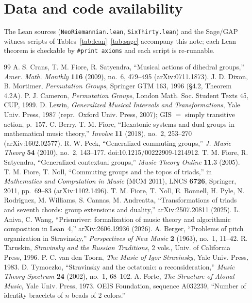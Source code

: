 \documentclass[11pt]{article}
\newcommand{\lean}[1]{\texttt{#1}}
\begin{document}
\section*{Data and code availability}
The Lean sources (\lean{NeoRiemannian.lean}, \lean{SixThirty.lean}) and the Sage/GAP witness scripts of
Tables~\ref{tab:lean}--\ref{tab:sage} accompany this note; each Lean theorem is checkable by
\lean{\#print axioms} and each script is re-runnable.

\begin{thebibliography}{99}
 A. S. Crans, T. M. Fiore, R. Satyendra, ``Musical actions of dihedral groups,''
  \emph{Amer. Math. Monthly} \textbf{116} (2009), no.~6, 479--495 (arXiv:0711.1873).
 J. D. Dixon, B. Mortimer, \emph{Permutation Groups}, Springer GTM 163, 1996
  (\S4.2, Theorem 4.2A).
 P. J. Cameron, \emph{Permutation Groups}, London Math. Soc. Student Texts 45, CUP, 1999.
 D. Lewin, \emph{Generalized Musical Intervals and Transformations}, Yale Univ. Press,
  1987 (repr.\ Oxford Univ. Press, 2007); GIS $=$ simply transitive action, p.~157.
 C. Berry, T. M. Fiore, ``Hexatonic systems and dual groups in mathematical music theory,''
  \emph{Involve} \textbf{11} (2018), no.~2, 253--270 (arXiv:1602.02577).
 R. W. Peck, ``Generalized commuting groups,'' \emph{J. Music Theory} \textbf{54} (2010),
  no.~2, 143--177. doi:10.1215/00222909-1214912.
 T. M. Fiore, R. Satyendra, ``Generalized contextual groups,'' \emph{Music Theory Online}
  \textbf{11}.3 (2005).
 T. M. Fiore, T. Noll, ``Commuting groups and the topos of triads,'' in
  \emph{Mathematics and Computation in Music} (MCM 2011), LNCS \textbf{6726}, Springer, 2011, pp.~69--83
  (arXiv:1102.1496).
 T. M. Fiore, T. Noll, E. Bonnell, H. Pyle, N. Rodriguez, M. Williams, S. Cannas,
  M. Andreatta, ``Transformations of triads and seventh chords: group extensions and duality,''
  arXiv:2507.20811 (2025).
 L. Aniva, C. Wang, ``Prismriver: formalization of music theory and algorithmic
  composition in Lean~4,'' arXiv:2606.19936 (2026).
 A. Berger, ``Problems of pitch organization in Stravinsky,'' \emph{Perspectives of New
  Music} \textbf{2} (1963), no.~1, 11--42.
 R. Taruskin, \emph{Stravinsky and the Russian Traditions}, 2 vols., Univ. of
  California Press, 1996.
 P. C. van den Toorn, \emph{The Music of Igor Stravinsky}, Yale Univ. Press, 1983.
 D. Tymoczko, ``Stravinsky and the octatonic: a reconsideration,'' \emph{Music
  Theory Spectrum} \textbf{24} (2002), no.~1, 68--102.
 A. Forte, \emph{The Structure of Atonal Music}, Yale Univ. Press, 1973.
 OEIS Foundation, sequence A032239, ``Number of identity bracelets of $n$ beads of 2
  colors.''
\end{thebibliography}
\end{document}
